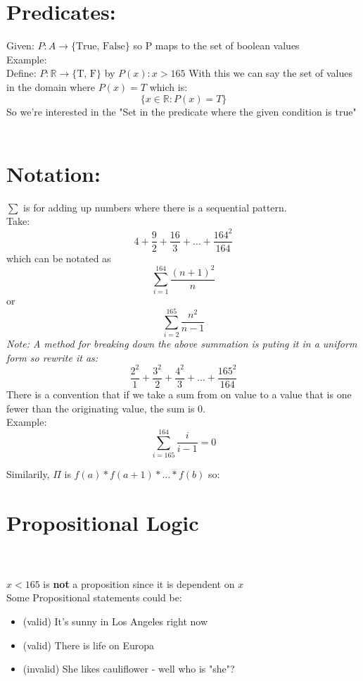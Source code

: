 \documentclass[12pt, letterpaper, twoside]{article}
\newcommand{\R}{\mathbb{R}}
\begin{document}
\section{Predicates:}
Given: $P: A \to \{\text{True, False}\}$ so P maps to the set of boolean values\\
Example:\\
Define: $P: \R \to \{\text{T, F}\}$ by $P(x) : x > 165$
With this we can say the set of values in the domain where $P(x) = T$ which is:
$$\{x \in \R : P(x) = T\}$$
So we're interested in the "Set in the predicate where the given condition is true"
\\
\\
\section{Notation:}
$\sum$ is for adding up numbers where there is a sequential pattern.\\
Take: $$4 + \frac{9}{2} + \frac{16}{3} + \dots + \frac{164^2}{164}$$ 
which can be notated as $$\sum_{i = 1}^{164} \frac{(n + 1)^2}{n}$$ or $$\sum_{i = 2}^{165} \frac{n^2}{n - 1}$$
\textit{Note: A method for breaking down the above summation is puting it in a uniform form so rewrite it as:} \\
$$\frac{2^2}{1} + \frac{3^2}{2} + \frac{4^2}{3} + \dots + \frac{165^2}{164}$$
There is a convention that if we take a sum from on value to a value that is one fewer than the originating value, the sum is 0.\\
Example:
$$\sum_{i = 165}^{164} \frac{i}{i-1} = 0$$

Similarily, $\Pi$ is $f(a) * f(a + 1) * \dots * f(b)$ so:

\section{Propositional Logic}
 \\ \\
$x < 165$ is \textbf{not} a proposition since it is dependent on $x$\\
Some Propositional statements could be:
\begin{itemize}
	\item (valid) It's sunny in Los Angeles right now
	\item (valid) There is life on Europa
	\item (invalid) She likes cauliflower - well who is "she"?
\end{itemize}
\end{document}
